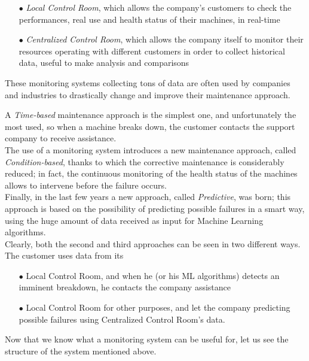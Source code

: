 \documentclass[12pt]{report}
\begin{document}
{\begin{itemize}
\setlength{\itemindent}{+4mm}
\item[$\bullet$] \emph{Local Control Room}, which allows the company's customers to check the performances, real use and health status of their machines, in real-time
\item[$\bullet$] \emph{Centralized Control Room}, which allows the company itself to monitor their resources operating with different customers in order to collect historical data, useful to make analysis and comparisons
\end{itemize}

These monitoring systems collecting tons of data are often used by companies and industries to drastically change and improve their maintenance approach.

A \emph{Time-based} maintenance approach is the simplest one, and unfortunately the most used, so when a machine breaks down, the customer contacts the support company to receive assistance.\\
The use of a monitoring system introduces a new maintenance approach, called \emph{Condition-based}, thanks to which the corrective maintenance is considerably reduced; in fact, the continuous monitoring of the health status of the machines allows to intervene before the failure occurs.\\
Finally, in the last few years a new approach, called \emph{Predictive}, was born; this approach is based on the possibility of predicting possible failures in a smart way, using the huge amount of data received as input for Machine Learning algorithms.\\

Clearly, both the second and third approaches can be seen in two different ways. The customer uses data from its 

\begin{itemize}
\setlength{\itemindent}{+4mm}
\item[$\bullet$] Local Control Room, and when he (or his ML algorithms) detects an imminent breakdown, he contacts the company assistance
\item[$\bullet$] Local Control Room for other purposes, and let the company predicting possible failures using Centralized Control Room's data.\\
\end{itemize}

Now that we know what a monitoring system can be useful for, let us see the structure of the system mentioned above.\\

}
\end{document}
